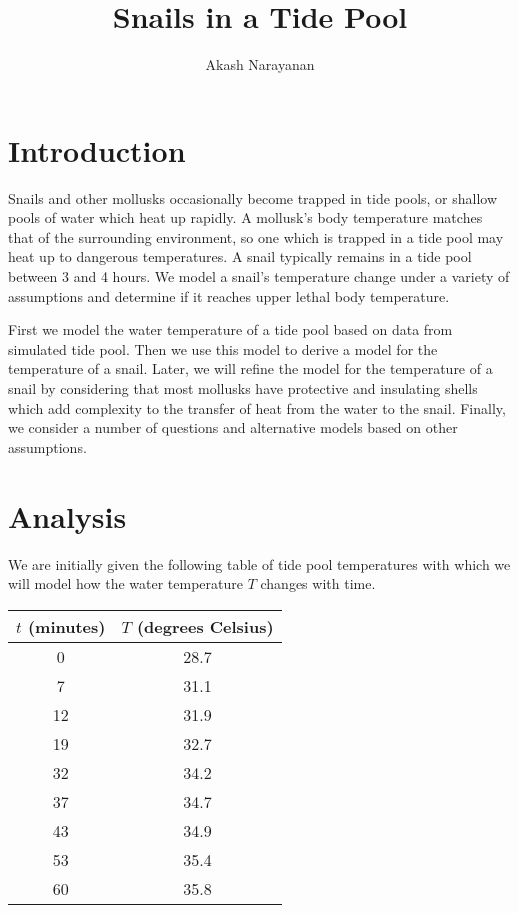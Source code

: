 \documentclass{article}
\title{Snails in a Tide Pool}
\author{Akash Narayanan}
\date{}
\begin{document}
  \maketitle

  \section{Introduction}
  Snails and other mollusks occasionally become trapped in tide pools, or shallow pools of water which heat up rapidly.
  A mollusk's body temperature matches that of the surrounding environment, so one which is trapped in a tide pool may heat up to dangerous temperatures.
  A snail typically remains in a tide pool between 3 and 4 hours.
  We model a snail's temperature change under a variety of assumptions and determine if it reaches upper lethal body temperature.

  First we model the water temperature of a tide pool based on data from simulated tide pool.
  Then we use this model to derive a model for the temperature of a snail.
  Later, we will refine the model for the temperature of a snail by considering that most mollusks have protective and insulating shells which add complexity to the transfer of heat from the water to the snail.
  Finally, we consider a number of questions and alternative models based on other assumptions.



  \section{Analysis}
  We are initially given the following table of tide pool temperatures with which we will model how the water temperature \(T\) changes with time.
   \begin{center}
     \begin{tabular}{ |c|c| }
       \hline
       \(t\) (minutes) & \(T\) (degrees Celsius) \\
       \hline
       0 & 28.7 \\
       \hline
       7 & 31.1 \\
       \hline
       12 & 31.9 \\
       \hline
       19 & 32.7 \\
       \hline
       32 & 34.2 \\
       \hline
       37 & 34.7 \\
       \hline
       43 & 34.9 \\
       \hline
       53 & 35.4 \\
       \hline
       60 & 35.8 \\
       \hline
     \end{tabular}
   \end{center}
\end{document}
